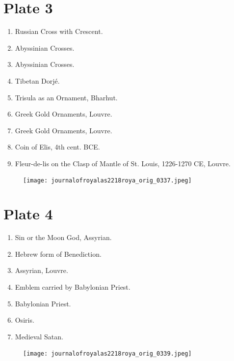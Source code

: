 \documentclass[a4paper, 11pt, oneside, english, landscape, twocolumn]{article}
\begin{document}
\section*{Plate 3}
\begin{enumerate}
    \item Russian Cross with Crescent.

    \item Abyssinian Crosses.

    \item Abyssinian Crosses.

    \item Tibetan Dorjé.

    \item Trisula as an Ornament, Bharhut.

    \item Greek Gold Ornaments, Louvre.

    \item Greek Gold Ornaments, Louvre.

    \item Coin of Elis, 4th cent. BCE.

    \item Fleur-de-lis on the Clasp of Mantle of St. Louis, 1226-1270 CE, Louvre.
\end{enumerate}
\vspace*{\fill}  
\clearpage
\clearpage
\vspace*{\fill}  
\begin{figure}[H]
\centering
\texttt{[image: journalofroyalas2218roya\_orig\_0337.jpeg]}
\end{figure}
\vspace*{\fill} 
\clearpage
\vspace*{\fill}  
\section*{Plate 4}
\begin{enumerate}
    \item Sin or the Moon God, Assyrian.

    \item Hebrew form of Benediction.

    \item Assyrian, Louvre.

    \item Emblem carried by Babylonian Priest.

    \item Babylonian Priest.

    \item Osiris.

    \item Medieval Satan.
\end{enumerate}
\vspace*{\fill}  
\clearpage
\clearpage
\vspace*{\fill}  
\begin{figure}[H]
\centering
\texttt{[image: journalofroyalas2218roya\_orig\_0339.jpeg]}
\end{figure}
\vspace*{\fill} 
\clearpage
\vspace*{\fill}  
\end{document}
